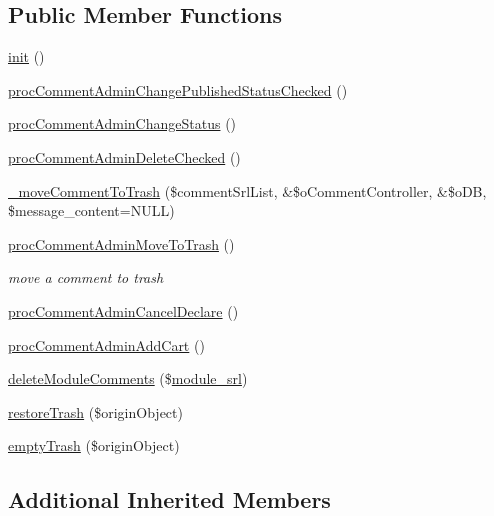 \subsection*{Public Member Functions}
\begin{DoxyCompactItemize}
\item 
\hyperlink{classcommentAdminController_abf17eb18137aa56c78b455fdd2b71b1f}{init} ()
\item 
\hyperlink{classcommentAdminController_a7d6c3e0db01617f4789f42617a876da0}{proc\+Comment\+Admin\+Change\+Published\+Status\+Checked} ()
\item 
\hyperlink{classcommentAdminController_a70bde7bc9124b72df7bdf6bf09633148}{proc\+Comment\+Admin\+Change\+Status} ()
\item 
\hyperlink{classcommentAdminController_ad62c47962884acf8b3a862f075b31343}{proc\+Comment\+Admin\+Delete\+Checked} ()
\item 
\hyperlink{classcommentAdminController_a2ac42957d98a26a13576e174ec5fc4e6}{\+\_\+move\+Comment\+To\+Trash} (\$comment\+Srl\+List, \&\$o\+Comment\+Controller, \&\$o\+DB, \$message\+\_\+content=N\+U\+LL)
\item 
\hyperlink{classcommentAdminController_a714ff343633602dc806e0dc257a12a7f}{proc\+Comment\+Admin\+Move\+To\+Trash} ()
\begin{DoxyCompactList}\small\item\em move a comment to trash \end{DoxyCompactList}\item 
\hyperlink{classcommentAdminController_ae0673fe66c74aa6ebfd8c6f1e5d0c627}{proc\+Comment\+Admin\+Cancel\+Declare} ()
\item 
\hyperlink{classcommentAdminController_adea631f91fd944326a1363dbff258d2f}{proc\+Comment\+Admin\+Add\+Cart} ()
\item 
\hyperlink{classcommentAdminController_a72c265be53cc3b664cd0702a568bc05f}{delete\+Module\+Comments} (\$\hyperlink{ko_8install_8php_a370bb6450fab1da3e0ed9f484a38b761}{module\+\_\+srl})
\item 
\hyperlink{classcommentAdminController_aede089003a6f45e3982a6a7e97b63cdf}{restore\+Trash} (\$origin\+Object)
\item 
\hyperlink{classcommentAdminController_a2b58a744dab20359d036052d505dbb49}{empty\+Trash} (\$origin\+Object)
\end{DoxyCompactItemize}
\subsection*{Additional Inherited Members}


